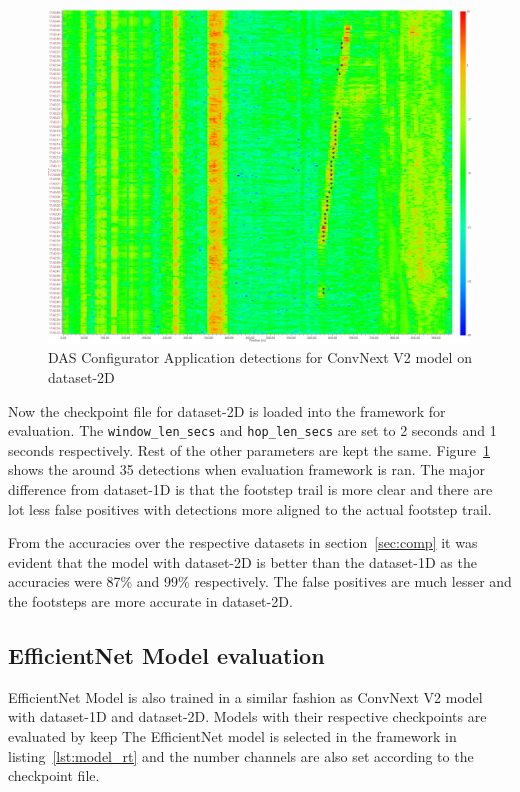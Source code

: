 \begin{figure}[h]
  \centering
  \includegraphics[width=0.9\linewidth]{Bilder/jpg/conv_2d_eval.jpg}
  \caption{DAS Configurator Application detections for ConvNext V2 model on dataset-2D}
  \label{conv_2d_eval}
\end{figure}

Now the checkpoint file for dataset-2D is loaded into the framework for evaluation. The \texttt{window\_len\_secs} and \texttt{hop\_len\_secs} are set to 2 seconds and 1 seconds respectively. Rest of the other parameters are kept the same. Figure~\ref{conv_2d_eval} shows the around 35 detections when evaluation framework is ran. The major difference from dataset-1D is that the footstep trail is more clear and there are lot less false positives with detections more aligned to the actual footstep trail.

From the accuracies over the respective datasets in section~\ref{sec:comp} it was evident that the model with dataset-2D is better than the dataset-1D as the accuracies were 87\% and 99\% respectively. The false positives are much lesser and the footsteps are more accurate in dataset-2D. 

\subsection{EfficientNet Model evaluation}
\label{sec:eff_eval}
EfficientNet Model is also trained in a similar fashion as ConvNext V2 model with dataset-1D and dataset-2D. Models with their respective checkpoints are evaluated by keep The EfficientNet model is selected in the framework in listing~\ref{lst:model_rt} and the number channels are also set according to the checkpoint file. 

